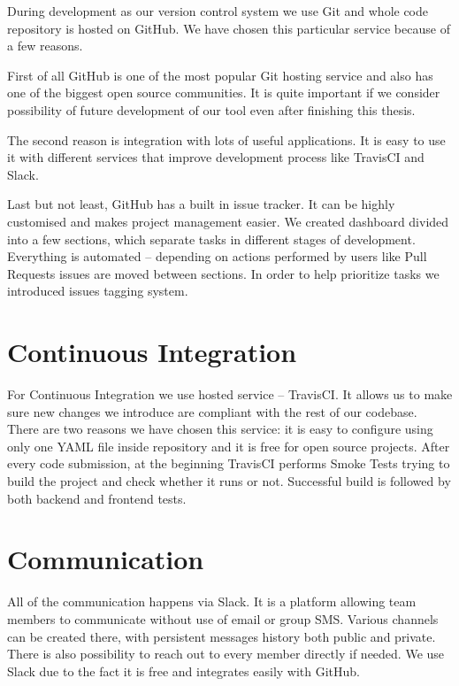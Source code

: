 \documentclass[licencjacka,en]{thesisclass}
\begin{document}
    During development as our version control system we use Git and whole code repository is hosted on GitHub.
    We have chosen this particular service because of a few reasons.

    First of all GitHub\cite{GitHub} is one of the most popular Git hosting service and also has one of the biggest open source communities.
    It is quite important if we consider possibility of future development of our tool even after finishing this thesis.

    The second reason is integration with lots of useful applications.
    It is easy to use it with different services that improve development process like TravisCI\cite{TravisCI} and Slack\cite{Slack}.

    Last but not least, GitHub has a built in issue tracker.
    It can be highly customised and makes project management easier.
    We created dashboard divided into a few sections, which separate tasks in different stages of development.
    Everything is automated -- depending on actions performed by users like Pull Requests issues are moved between sections.
    In order to help prioritize tasks we introduced issues tagging system.

    \section{Continuous Integration}

    For Continuous Integration we use hosted service -- TravisCI. It allows us to make sure new changes we introduce are compliant with the rest of our codebase.
    There are two reasons we have chosen this service: it is easy to configure using only one YAML file inside repository and it is free for open source projects.
    After every code submission, at the beginning TravisCI performs Smoke Tests trying to build the project and check whether it runs or not.
    Successful build is followed by both backend and frontend tests.

    \section{Communication}

    All of the communication happens via Slack.
    It is a platform allowing team members to communicate without use of email or group SMS.
    Various channels can be created there, with persistent messages history both public and private.
    There is also possibility to reach out to every member directly if needed.
    We use Slack due to the fact it is free and integrates easily with GitHub.
\end{document}
